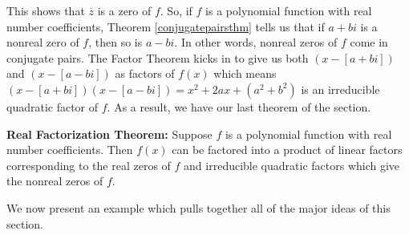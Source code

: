 This shows that $\overline{z}$ is a zero of $f$.  So, if $f$ is a polynomial function with real number coefficients, Theorem \ref{conjugatepairsthm} tells us that if $a+bi$ is a nonreal zero of $f$, then so is $a-bi$.  In other words, nonreal zeros of $f$ come in conjugate pairs.  The Factor Theorem kicks in to give us both $(x-[a+bi])$ and $(x-[a-bi])$ as factors of $f(x)$ which means $(x-[a+bi])(x-[a-bi]) = x^2 + 2a x + \left(a^2+b^2\right)$ is an irreducible quadratic factor of $f$.  As a result, we have our last theorem of the section.

\smallskip

\colorbox{ResultColor}{\bbm
\begin{thm}\label{realfactorization}\textbf{Real Factorization Theorem:} Suppose $f$ is a polynomial function with real number coefficients.  Then $f(x)$ can be factored into a product of linear factors corresponding to the real zeros of $f$ and irreducible quadratic factors which give the nonreal zeros of $f$. 
\end{thm}
\ebm}

\smallskip

We now present an example which pulls together all of the major ideas of this section.

